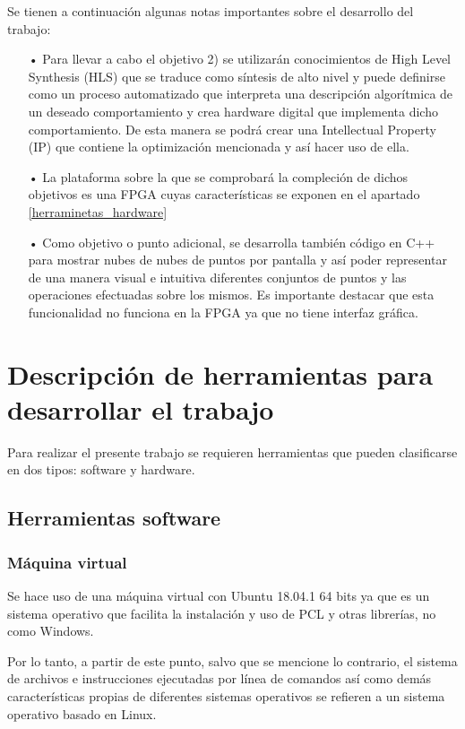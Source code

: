 Se tienen a continuación algunas notas importantes sobre el desarrollo del trabajo:
\begin{itemize}
\item[•] Para llevar a cabo el objetivo 2) se utilizarán conocimientos de High Level Synthesis (HLS) que se traduce como síntesis de alto nivel y puede definirse como un proceso automatizado que interpreta una descripción algorítmica de un deseado comportamiento y crea hardware digital que implementa dicho comportamiento. De esta manera se podrá crear una Intellectual Property (IP) que contiene la optimización mencionada y así hacer uso de ella.
\item[•] La plataforma sobre la que se comprobará la compleción de dichos objetivos es una FPGA cuyas características se exponen en el apartado \ref{herraminetas_hardware}
\item[•] Como objetivo o punto adicional, se desarrolla también código en C++ para mostrar nubes de nubes de puntos por pantalla y así poder representar de una manera visual e intuitiva diferentes conjuntos de puntos y las operaciones efectuadas sobre los mismos. Es importante destacar que esta funcionalidad no funciona en la FPGA ya que no tiene interfaz gráfica.

\end{itemize}

 

\section{Descripción de herramientas para desarrollar el trabajo}
Para realizar el presente trabajo se requieren herramientas que pueden clasificarse en dos tipos: software y hardware.

\subsection{Herramientas software}
\subsubsection{Máquina virtual}
Se hace uso de una máquina virtual con Ubuntu\cite{ubuntu} 18.04.1 64 bits ya que es un sistema operativo que facilita la instalación y uso de PCL y otras librerías, no como Windows. 

Por lo tanto, a partir de este punto, salvo que se mencione lo contrario, el sistema de archivos e instrucciones ejecutadas por línea de comandos así como demás características propias de diferentes sistemas operativos se refieren a un sistema operativo basado en Linux.

